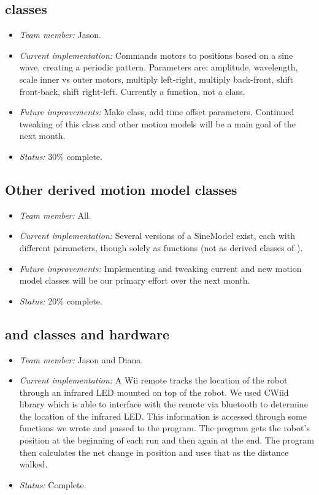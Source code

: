 \subsection*{ classes}

\begin{itemize}
\item \emph{Team member:} Jason.
\item \emph{Current implementation:} Commands motors to positions
  based on a sine wave, creating a periodic pattern. Parameters are:
  amplitude, wavelength, scale inner vs outer motors, multiply
  left-right, multiply back-front, shift front-back, shift right-left.
  Currently a function, not a class.
\item \emph{Future improvements:} Make class, add time offset
  parameters.  Continued tweaking of this class and other motion
  models will be a main goal of the next month.
\item \emph{Status:} 30\% complete.
\end{itemize}



\subsection*{Other derived motion model classes}

\begin{itemize}
\item \emph{Team member:} All.
\item \emph{Current implementation:} Several versions of a SineModel
  exist, each with different parameters, though solely as functions
  (not as derived classes of ).
\item \emph{Future improvements:} Implementing and tweaking current
  and new motion model classes will be our primary effort over the
  next month.
\item \emph{Status:} 20\% complete.
\end{itemize}



\subsection*{ and  classes
 and hardware}

\begin{itemize}
\item \emph{Team member:} Jason and Diana.
\item \emph{Current implementation:} A Wii remote tracks the location of the robot through an infrared LED mounted on top of the robot. We used CWiid library which is able to interface with the remote via bluetooth to determine the location of the infrared LED. This information is accessed through some functions we wrote and passed to the program. The program gets the robot's position at the beginning of each run and then again at the end. The program then calculates the net change in position and uses that as the distance walked.
\item \emph{Status:} Complete.
\end{itemize}



